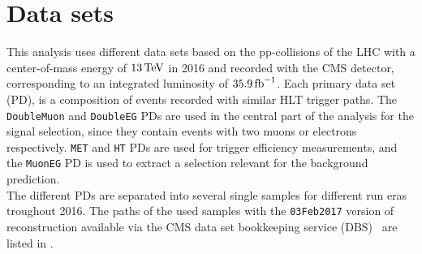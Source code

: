 \section{Data sets}
This analysis uses different data sets based on the pp-collisions of the LHC with a center-of-mass energy of $13\,\text{Te\hspace{-.08em}V}$ in 2016 and recorded with the CMS detector, corresponding to an integrated luminosity of $35.9\mbox{\ensuremath{\,\text{fb}^\text{$-$1}}}$. Each primary data set (PD), is a composition of events recorded with similar HLT trigger paths. The \texttt{DoubleMuon} and \texttt{DoubleEG} PDs are used in the central part of the analysis for the signal selection, since they contain events with two muons or electrons respectively. \texttt{MET} and \texttt{HT} PDs are used for trigger efficiency measurements, and the \texttt{MuonEG} PD is used to extract a selection relevant for the background prediction.\\
The different PDs are separated into several single samples for different run eras troughout 2016. The paths of the used samples with the \texttt{03Feb2017} version of reconstruction available via the CMS data set bookkeeping service (DBS)~\cite{DASBookkeeping} are listed in .


